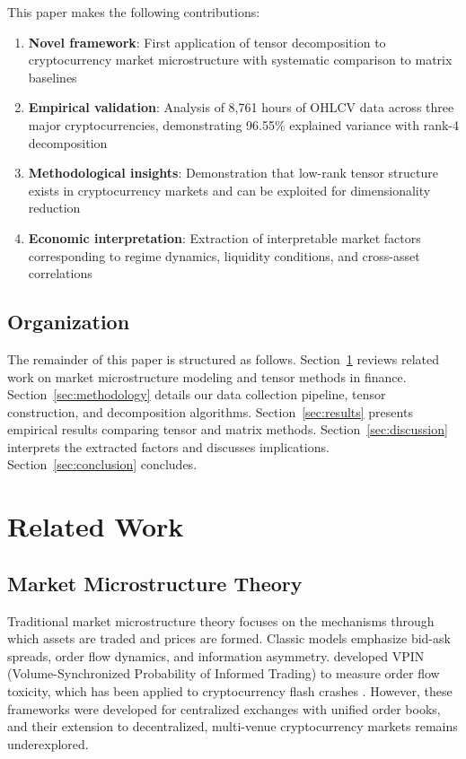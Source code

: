 \documentclass{article}
\begin{document}
This paper makes the following contributions:

\begin{enumerate}[leftmargin=*]
    \item \textbf{Novel framework}: First application of tensor decomposition to cryptocurrency market microstructure with systematic comparison to matrix baselines
    \item \textbf{Empirical validation}: Analysis of 8,761 hours of OHLCV data across three major cryptocurrencies, demonstrating 96.55\% explained variance with rank-4 decomposition
    \item \textbf{Methodological insights}: Demonstration that low-rank tensor structure exists in cryptocurrency markets and can be exploited for dimensionality reduction
    \item \textbf{Economic interpretation}: Extraction of interpretable market factors corresponding to regime dynamics, liquidity conditions, and cross-asset correlations
\end{enumerate}

\subsection{Organization}

The remainder of this paper is structured as follows. Section~\ref{sec:related} reviews related work on market microstructure modeling and tensor methods in finance. Section~\ref{sec:methodology} details our data collection pipeline, tensor construction, and decomposition algorithms. Section~\ref{sec:results} presents empirical results comparing tensor and matrix methods. Section~\ref{sec:discussion} interprets the extracted factors and discusses implications. Section~\ref{sec:conclusion} concludes.

\section{Related Work}
\label{sec:related}

\subsection{Market Microstructure Theory}

Traditional market microstructure theory \citep{OHara1995Market,Hasbrouck2007Empirical} focuses on the mechanisms through which assets are traded and prices are formed. Classic models emphasize bid-ask spreads, order flow dynamics, and information asymmetry. \citet{Easley2012Flow} developed VPIN (Volume-Synchronized Probability of Informed Trading) to measure order flow toxicity, which has been applied to cryptocurrency flash crashes \citep{Easley2024CrossAsset}. However, these frameworks were developed for centralized exchanges with unified order books, and their extension to decentralized, multi-venue cryptocurrency markets remains underexplored.
\end{document}
